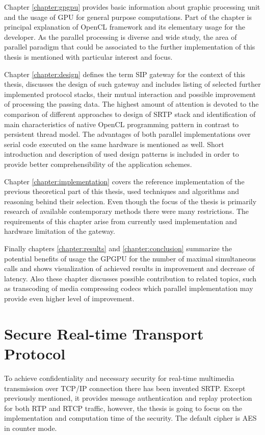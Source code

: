 Chapter \ref{chapter:gpgpu} provides basic information about graphic processing 
unit and the usage of GPU for general purpose computations. Part of the chapter 
is principal explanation of OpenCL framework and its elementary usage for the 
developer. As the parallel processing is diverse and wide study, the area of 
parallel paradigm that could be associated to the further implementation of
this thesis is mentioned with particular interest and focus. 

Chapter \ref{chapter:design} defines the term SIP gateway for the context of 
this thesis, discusses the design of such gateway and includes
listing of selected further implemented protocol stacks, their mutual 
interaction and possible improvement of processing the passing data. The highest
amount of attention is devoted to the comparison of different approaches to
design of SRTP stack and identification of main characteristics of native
OpenCL programming pattern in contrast to persistent thread model. The advantages
of both parallel implementations over serial code executed on the same hardware
is mentioned as well. Short introduction and description of used design patterns
is included in order to provide better comprehensibility of the application 
schemes.

Chapter \ref{chapter:implementation} covers the reference implementation of
the previous theoretical part of this thesis, used techniques and algorithms and
reasoning behind their selection. Even though the focus of the thesis is
primarily research of available contemporary methods there were many
restrictions. The requirements of this chapter arise from currently used
implementation and hardware limitation of the gateway.

Finally chapters \ref{chapter:results} and \ref{chapter:conclusion} summarize
the potential benefits of usage the GPGPU for the number of maximal simultaneous 
calls and shows visualization of achieved results in improvement and decrease of
latency. Also these chapter discusses possible contribution to related topics, 
such as transcoding of media compressing codecs which parallel implementation 
may provide even higher level of improvement.









\chapter{Secure Real-time Transport Protocol}\label{chapter:srtp}
To achieve confidentiality and necessary security for real-time multimedia
transmission over TCP/IP connection there has been invented SRTP\cite{
rfc3711}. Except previously mentioned, it provides message
authentication and replay protection for both RTP and RTCP traffic, 
however, the thesis is going to focus on the implementation and computation
time of the security. The default cipher is AES in counter mode.

